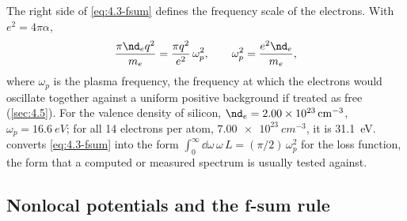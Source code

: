The right side of \cref{eq:4.3-fsum} defines the frequency scale of the electrons. With $e^2 = 4\pi\alpha$,
\begin{equation}
  \frac{\pi\nd_eq^2}{m_e} = \frac{\pi q^2}{e^2}\,\omega_p^2, \qquad \omega_p^2 = \frac{e^2\nd_e}{m_e} ,
  \label{eq:4.3-wp}
\end{equation}
where $\omega_p$ is the plasma frequency, the frequency at which the electrons would oscillate together against a uniform positive background if treated as free (\cref{sec:4.5}). For the valence density of silicon, $\nd_e = \SI{2.00e23}{cm^{-3}}$, $\omega_p = \SI{16.6}{eV}$; for all 14 electrons per atom, $\SI{7.00e23}{cm^{-3}}$, it is \SI{31.1}{eV}.  converts \cref{eq:4.3-fsum} into the form $\int_0^\infty\dd\omega\,\omega\,L = (\pi/2)\,\omega_p^2$ for the loss function, the form that a computed or measured spectrum is usually tested against.

\subsection{Nonlocal potentials and the f-sum rule}

